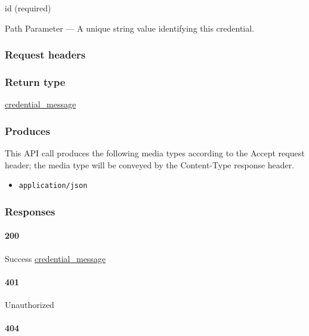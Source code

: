 id (required)

{Path Parameter} --- A unique string value identifying this credential.

\hypertarget{request-headers-32}{%
\subsubsection{Request headers}\label{request-headers-32}}

\hypertarget{return-type-47}{%
\subsubsection{Return type}\label{return-type-47}}

\protect\hyperlink{credential_message}{credential\_message}

\hypertarget{produces-58}{%
\subsubsection{Produces}\label{produces-58}}

This API call produces the following media types according to the
{Accept} request header; the media type will be conveyed by the
{Content-Type} response header.

\begin{itemize}
\tightlist
\item
  \texttt{application/json}
\end{itemize}

\hypertarget{responses-58}{%
\subsubsection{Responses}\label{responses-58}}

\hypertarget{section-191}{%
\paragraph{200}\label{section-191}}

Success \protect\hyperlink{credential_message}{credential\_message}

\hypertarget{section-192}{%
\paragraph{401}\label{section-192}}

Unauthorized \protect\hyperlink{}{}

\hypertarget{section-193}{%
\paragraph{404}\label{section-193}}

